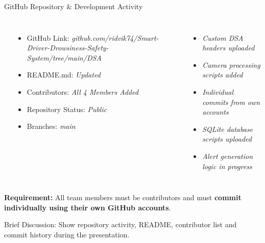 \documentclass[aspectratio=169,11pt]{beamer}
\newcommand{\smallnote}[1]{%
\vspace{0.08cm}
{\scriptsize\color{GEUGrey}#1}
}
\newcommand{\placeholder}[1]{%
\textit{\color{GEUGrey}#1}
}
\begin{document}
\begin{frame}{GitHub Repository \& Development Activity}
\vspace{-2mm}
\begin{columns}[T, totalwidth=\textwidth]
\textbf{\color{GEUBlue}{Repository Information}}
\begin{itemize}
\itemsep 1pt
\item GitHub Link: \placeholder{github.com/ridvik74/Smart-Driver-Drowsiness-Safety-System/tree/main/DSA}
\item README.md: \placeholder{Updated}
\item Contributors: \placeholder{All 4 Members Added}
\item Repository Status: \placeholder{Public}
\item Branches: \placeholder{main}
\end{itemize}

\textbf{\color{GEUBlue}{Development Activity}}
\begin{itemize}
\itemsep 1pt
\item \placeholder{Custom DSA headers uploaded}
\item \placeholder{Camera processing scripts added}
\item \placeholder{Individual commits from own accounts}
\item \placeholder{SQLite database scripts uploaded}
\item \placeholder{Alert generation logic in progress}
\end{itemize}
\end{columns}

\vspace{1mm}
\begin{center}
\colorbox{GEULightBlue}{\parbox{.88\textwidth}{\centering \textbf{Requirement:} All team members must be contributors and must \textbf{commit individually using their own GitHub accounts}.}}
\end{center}

\vspace{-1mm}
\smallnote{Brief Discussion: Show repository activity, README, contributor list and commit history during the presentation.}
\end{frame}
\end{document}
